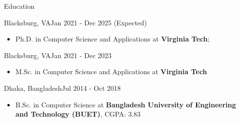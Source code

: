 \documentclass[]{mcdowellcv}
\begin{document}
	\makeheader
	
	\begin{cvsection}{Education}
		\begin{cvsubsection}{Blacksburg, VA}{}{Jan 2021 - Dec 2025 (Expected)}
			\begin{itemize}
				\item Ph.D. in Computer Science and Applications at \textbf{Virginia Tech}; %
			\end{itemize}
		\end{cvsubsection}
		\begin{cvsubsection}{Blacksburg, VA}{}{Jan 2021 - Dec 2023}
			\begin{itemize}
				\item M.Sc. in Computer Science and Applications at \textbf{Virginia Tech}
			\end{itemize}
		\end{cvsubsection}
		\begin{cvsubsection}{Dhaka, Bangladesh}{}{Jul 2014 - Oct 2018}
			\begin{itemize}
				\item B.Sc. in Computer Science at \textbf{Bangladesh University of Engineering and Technology (BUET)}, CGPA: 3.83
			\end{itemize}
		\end{cvsubsection}
	\end{cvsection}
\end{document}
